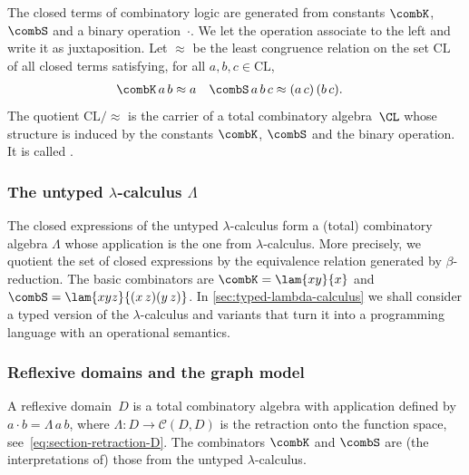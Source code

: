 The closed terms of combinatory logic are generated from constants $\combK$, $\combS$ and a binary operation~$\cdot$.
We let the operation associate to the left and write it as juxtaposition.
%
Let $\approx$ be the least congruence relation
on the set $\mathrm{CL}$ of all closed terms satisfying, for all $a, b, c \in \mathrm{CL}$,
%
\begin{align*}
  \combK \, a \, b &\approx a
  &
  \combS \, a \, b \, c &\approx (a \, c) \, (b \, c).
\end{align*}
%
The quotient $\mathrm{CL}/{\approx}$ is the carrier of a total combinatory algebra~$\CL$ whose structure is induced by the constants $\combK$, $\combS$ and the binary operation. It is called .


\subsubsection[\texorpdfstring%
{The untyped $\lambda$-calculus $\Lambda$}%
{The untyped lambda-calculus Lambda}%
]{The untyped $\lambda$-calculus $\Lambda$}
\label{sec:lambda-calculus-pca}

The closed expressions of the untyped $\lambda$-calculus form a
(total) combinatory algebra $\Lambda$ whose application is the one from
$\lambda$-calculus. More precisely, we quotient the set of closed
expressions by the equivalence relation generated by
$\beta$-reduction. The basic combinators are $\combK = \lam{x y}{x}$
and $\combS = \lam{x y z}{(x \, z)(y \, z)}$.
%
In \cref{sec:typed-lambda-calculus} we shall consider a typed version of the $\lambda$-calculus and variants that turn it into a programming language with an operational semantics.


\subsubsection{Reflexive domains and the graph model}
\label{sec:reflexive-domain-pca}

A reflexive domain~$D$ is a total combinatory algebra with application defined by $a \cdot b = \Lambda \, a \, b$, where $\Lambda : D \to \mathcal{C}(D, D)$ is the
retraction onto the function space, see~\eqref{eq:section-retraction-D}. The combinators $\combK$ and $\combS$ are (the interpretations of) those from the untyped $\lambda$-calculus.

